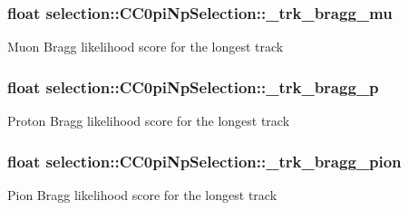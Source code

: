 \subsubsection[{\texorpdfstring{\+\_\+trk\+\_\+bragg\+\_\+mu}{_trk_bragg_mu}}]{\setlength{\rightskip}{0pt plus 5cm}float selection\+::\+C\+C0pi\+Np\+Selection\+::\+\_\+trk\+\_\+bragg\+\_\+mu\hspace{0.3cm}{\ttfamily [private]}}\hypertarget{classselection_1_1CC0piNpSelection_a9e7b081beb0ef9129f15a7fb965276f1}{}\label{classselection_1_1CC0piNpSelection_a9e7b081beb0ef9129f15a7fb965276f1}
Muon Bragg likelihood score for the longest track 
\subsubsection[{\texorpdfstring{\+\_\+trk\+\_\+bragg\+\_\+p}{_trk_bragg_p}}]{\setlength{\rightskip}{0pt plus 5cm}float selection\+::\+C\+C0pi\+Np\+Selection\+::\+\_\+trk\+\_\+bragg\+\_\+p\hspace{0.3cm}{\ttfamily [private]}}\hypertarget{classselection_1_1CC0piNpSelection_a52d578481ee7dd4fed45f8e3c8ed44da}{}\label{classselection_1_1CC0piNpSelection_a52d578481ee7dd4fed45f8e3c8ed44da}
Proton Bragg likelihood score for the longest track 
\subsubsection[{\texorpdfstring{\+\_\+trk\+\_\+bragg\+\_\+pion}{_trk_bragg_pion}}]{\setlength{\rightskip}{0pt plus 5cm}float selection\+::\+C\+C0pi\+Np\+Selection\+::\+\_\+trk\+\_\+bragg\+\_\+pion\hspace{0.3cm}{\ttfamily [private]}}\hypertarget{classselection_1_1CC0piNpSelection_a5371981bb5f02024c2ba1d986541ffd9}{}\label{classselection_1_1CC0piNpSelection_a5371981bb5f02024c2ba1d986541ffd9}
Pion Bragg likelihood score for the longest track 
